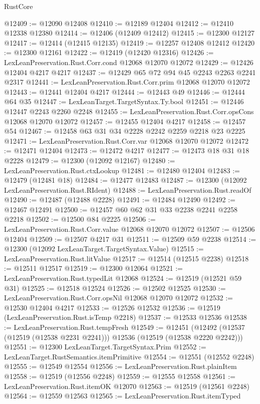 \begin{lexlean}{RustCore}
\begin{coremodule}
@12409 := @12090 @12408
@12410 := @12189 @12404
@12412 := @12410 @12338 @12380
@12414 := @12406 (@12409 @12412)
@12415 := @12300 @12127
@12417 := @12414 (@12415 @12135)
@12419 := @12257 @12408 @12412
@12420 := @12300 @12161
@12422 := @12419 (@12420 @12316)
@12426 := LexLeanPreservation.Rust.Corr.cond @12068 @12070 @12072
@12429 := @12426 @12404 @4217 @4217
@12437 := @12429 @65 @72 @94 @45 @2243 @2263 @2241 @2317
@12441 := LexLeanPreservation.Rust.Corr.prim @12068 @12070 @12072
@12443 := @12441 @12404 @4217
@12444 := @12443 @49
@12446 := @12444 @64 @35
@12447 := LexLeanTarget.TargetSyntax.Ty.bool
@12451 := @12446 @12447 @2243 @2260 @2248
@12455 := LexLeanPreservation.Rust.Corr.opsCons @12068 @12070 @12072
@12457 := @12455 @12404 @4217
@12458 := @12457 @54
@12467 := @12458 @63 @31 @34 @2228 @2242 @2259 @2218 @23 @2225
@12471 := LexLeanPreservation.Rust.Corr.var @12068 @12070 @12072
@12472 := @12471 @12404
@12473 := @12472 @4217
@12477 := @12473 @18 @31 @18 @2228
@12479 := @12300 (@12092 @12167)
@12480 := LexLeanPreservation.Rust.ctxLookup
@12481 := @12480 @12404
@12483 := @12479 (@12481 @18)
@12484 := @12477 @12483
@12487 := @12300 (@12092 LexLeanPreservation.Rust.RIdent)
@12488 := LexLeanPreservation.Rust.readOf
@12490 := @12487 (@12488 @2228)
@12491 := @12484 @12490
@12492 := @12467 @12491
@12500 := @12457 @60 @62 @31 @33 @2238 @2241 @2258 @2218
@12502 := @12500 @84 @2225
@12506 := LexLeanPreservation.Rust.Corr.value @12068 @12070 @12072
@12507 := @12506 @12404
@12509 := @12507 @4217 @31
@12511 := @12509 @59 @2238
@12514 := @12300 (@12092 LexLeanTarget.TargetSyntax.Value)
@12515 := LexLeanPreservation.Rust.litValue
@12517 := @12514 (@12515 @2238)
@12518 := @12511 @12517
@12519 := @12300 @12064
@12521 := LexLeanPreservation.Rust.typedLit @12068
@12524 := @12519 (@12521 @59 @31)
@12525 := @12518 @12524
@12526 := @12502 @12525
@12530 := LexLeanPreservation.Rust.Corr.opsNil @12068 @12070 @12072
@12532 := @12530 @12404 @4217
@12533 := @12526 @12532
@12536 := @12519 (LexLeanPreservation.Rust.isTemp @2218)
@12537 := @12533 @12536
@12538 := LexLeanPreservation.Rust.tempFresh
@12549 := @12451
    (@12492 (@12537 (@12519 (@12538 @2231 @2241))) @12536 (@12519 (@12538 @2220 @2242)))
@12551 := @12300 LexLeanTarget.TargetSyntax.Prim
@12552 := LexLeanTarget.RustSemantics.itemPrimitive
@12554 := @12551 (@12552 @2248)
@12555 := @12549 @12554
@12556 := LexLeanPreservation.Rust.plainItem
@12558 := @12519 (@12556 @2248)
@12559 := @12555 @12558
@12561 := LexLeanPreservation.Rust.itemOK @12070
@12563 := @12519 (@12561 @2248)
@12564 := @12559 @12563
@12565 := LexLeanPreservation.Rust.itemTyped

\end{coremodule}
\end{lexlean}
